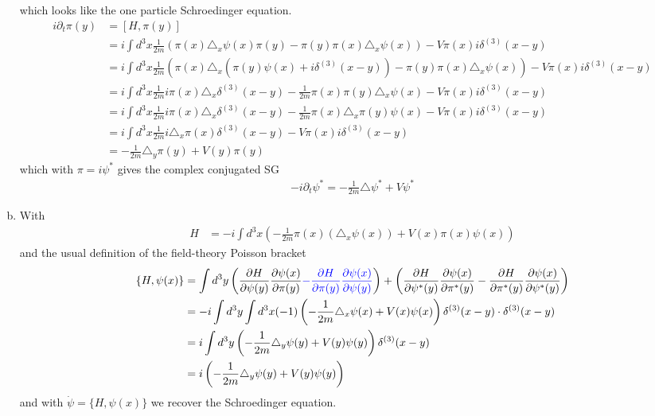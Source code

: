 \documentclass[10pt,a4paper]{report}
\theoremstyle{definition}
\begin{document}
\begin{enumerate}[a)]
which looks like the one particle Schroedinger equation.
\begin{align}
i\partial_t\pi(y)
&=[H,\pi(y)]\\
&=i\int d^3x\frac{1}{2m}\left(\pi(x)\triangle_x\psi(x)\pi(y)-\pi(y)\pi(x)\triangle_x\psi(x)\right) -V\pi(x)i\delta^{(3)}(x-y)\\
&=i\int d^3x\frac{1}{2m}\left(\pi(x)\triangle_x(\pi(y)\psi(x)+i\delta^{(3)}(x-y))-\pi(y)\pi(x)\triangle_x\psi(x)\right) -V\pi(x)i\delta^{(3)}(x-y)\\
&=i\int d^3x\frac{1}{2m}i\pi(x)\triangle_x\delta^{(3)}(x-y)-\frac{1}{2m}\pi(x)\pi(y)\triangle_x\psi(x) -V\pi(x)i\delta^{(3)}(x-y)\\
&=i\int d^3x\frac{1}{2m}i\pi(x)\triangle_x\delta^{(3)}(x-y)-\frac{1}{2m}\pi(x)\triangle_x\pi(y)\psi(x) -V\pi(x)i\delta^{(3)}(x-y)\\
&=i\int d^3x\frac{1}{2m}i\triangle_x\pi(x)\delta^{(3)}(x-y) -V\pi(x)i\delta^{(3)}(x-y)\\
&=-\frac{1}{2m}\triangle_y\pi(y) +V(y)\pi(y)
\end{align}
which with $\pi=i\psi^*$ gives the complex conjugated SG
\begin{align}
-i\partial_t\psi^*=-\frac{1}{2m}\triangle\psi^*+V\psi^*
\end{align}
\item With
\begin{align}
H&=-i\int d^3x \left(-\frac{1}{2m}\pi(x)(\triangle_x\psi(x))+V(x)\pi(x)\psi(x)\right)
\end{align}
and the usual definition of the field-theory Poisson bracket
\begin{align}
\{H,\psi(x)\}
&=\int d^3y\left(\frac{\partial H}{\partial\psi(y)}\frac{\partial\psi(x)}{\partial\pi(y)}
\textcolor{blue}{-\frac{\partial H}{\partial\pi(y)}\frac{\partial\psi(x)}{\partial\psi(y)}}\right)+
\left(\frac{\partial H}{\partial\psi^*(y)}\frac{\partial\psi(x)}{\partial\pi^*(y)}
-\frac{\partial H}{\partial\pi^*(y)}\frac{\partial\psi(x)}{\partial\psi^*(y)}\right)\\
&=-i\int d^3y\int d^3x (-1)\left(-\frac{1}{2m}\triangle_x\psi(x)+V(x)\psi(x)\right)\delta^{(3)}(x-y)\cdot\delta^{(3)}(x-y)\\
&=i\int d^3y \left(-\frac{1}{2m}\triangle_y\psi(y)+V(y)\psi(y)\right)\delta^{(3)}(x-y)\\
&=i\left(-\frac{1}{2m}\triangle_y\psi(y)+V(y)\psi(y)\right)
\end{align}
and with $\dot{\psi}=\{H,\psi(x)\}$ we recover the Schroedinger equation.


\end{enumerate}
\end{document}
